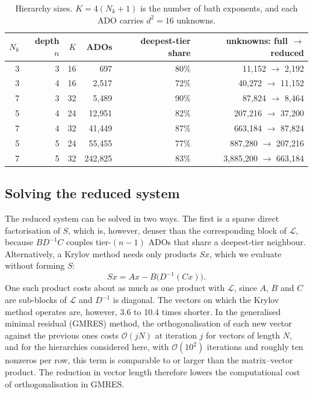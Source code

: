 \documentclass[11pt,a4paper]{article}
\newcommand{\Lc}{\mathcal{L}}
\begin{document}
\begin{table}[h]
\centering\small
\begin{tabular}{rrrrrr}
\toprule
$N_k$ & depth $n$ & $K$ & ADOs & deepest-tier share & unknowns: full $\to$ reduced\\
\midrule
3 & 3 & 16 & 697 & 80\% & 11{,}152 $\to$ 2{,}192\\
3 & 4 & 16 & 2{,}517 & 72\% & 40{,}272 $\to$ 11{,}152\\
7 & 3 & 32 & 5{,}489 & 90\% & 87{,}824 $\to$ 8{,}464\\
5 & 4 & 24 & 12{,}951 & 82\% & 207{,}216 $\to$ 37{,}200\\
7 & 4 & 32 & 41{,}449 & 87\% & 663{,}184 $\to$ 87{,}824\\
5 & 5 & 24 & 55{,}455 & 77\% & 887{,}280 $\to$ 207{,}216\\
7 & 5 & 32 & 242{,}825 & 83\% & 3{,}885{,}200 $\to$ 663{,}184\\
\bottomrule
\end{tabular}
\caption{Hierarchy sizes. $K = 4(N_k+1)$ is the number of bath exponents, and
each ADO carries $d^2 = 16$ unknowns.}
\label{tab:count}
\end{table}

\subsection{Solving the reduced system}

The reduced system can be solved in two ways. The first is a sparse direct
factorisation of $S$, which is, however, denser than
the corresponding block of $\Lc$, because $BD^{-1}C$ couples tier-$(n-1)$ ADOs
that share a deepest-tier neighbour. Alternatively, a Krylov method needs only
products $Sx$, which we evaluate without forming $S$:
\begin{equation}
Sx = Ax - B\big(D^{-1}(Cx)\big).
\label{eq:matfree}
\end{equation}
One such product costs about as much as one product with $\Lc$, since $A$, $B$ and
$C$ are sub-blocks of $\Lc$ and $D^{-1}$ is diagonal. The vectors on which the
Krylov method operates are, however, 3.6 to 10.4 times shorter. In the generalised minimal residual (GMRES) method, the
orthogonalisation of each new vector against the previous ones costs
$\mathcal{O}(jN)$ at iteration $j$ for vectors of length $N$, and for the
hierarchies considered here, with $\mathcal{O}(10^2)$ iterations and roughly ten
nonzeros per row, this term is comparable to or larger than the matrix--vector
product. The reduction in vector length therefore lowers the computational cost of
orthogonalisation in GMRES.
\end{document}
